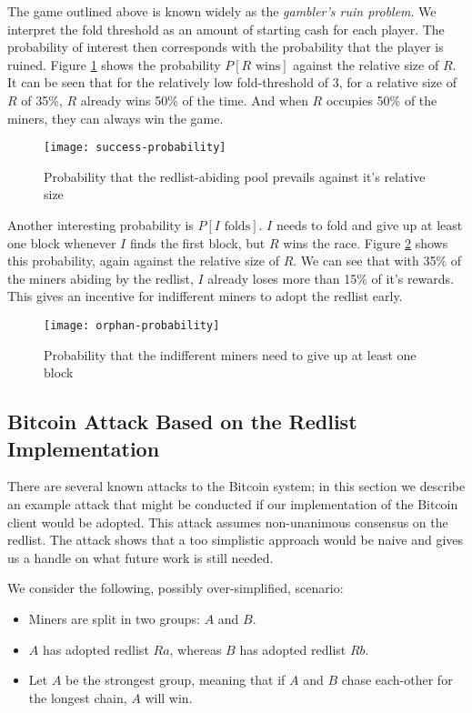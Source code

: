 \documentclass[12pt,journal,compsoc]{IEEEtran}
\begin{document}
The game outlined above is known widely as the \emph{gambler's ruin problem}\cite{feller}.
We interpret the fold threshold as an amount of starting cash for each player.
The probability of interest then corresponds with the probability that the player is ruined.
Figure \ref{fig:redlist-wins} shows the probability $P[\text{$R$ wins}]$ against the relative size
of $R$.
It can be seen that for the relatively low fold-threshold of $3$, for a relative size of $R$ of
35\%, $R$ already wins 50\% of the time.
And when $R$ occupies 50\% of the miners, they can always win the game.

\begin{figure}[h!]
\centering
\texttt{[image: success-probability]}
\caption{Probability that the redlist-abiding pool prevails against it's relative size}
\label{fig:redlist-wins}
\end{figure}

Another interesting probability is $P[\text{$I$ folds}]$.
$I$ needs to fold and give up at least one block whenever $I$ finds the first block, but $R$ wins
the race.
Figure \ref{fig:indif-folds} shows this probability, again against the relative size of $R$.
We can see that with 35\% of the miners abiding by the redlist, $I$ already loses more than 15\% of
it's rewards.
This gives an incentive for indifferent miners to adopt the redlist early.

\begin{figure}[h!]
\centering
\texttt{[image: orphan-probability]}
\caption{Probability that the indifferent miners need to give up at least one block}
\label{fig:indif-folds}
\end{figure}

\subsection{Bitcoin Attack Based on the Redlist Implementation}
There are several known attacks to the Bitcoin system\cite{barber2012bitter}; in this section we describe an example attack that might be conducted if our implementation of the Bitcoin client would be
adopted. This attack assumes non-unanimous consensus on the redlist.
The attack shows that a too simplistic approach would be naive and gives us a handle on what future work
is still needed.

We consider the following, possibly over-simplified, scenario:

\begin{itemize}
  \item Miners are split in two groups: $A$ and $B$.
  \item $A$ has adopted redlist $Ra$, whereas $B$ has adopted redlist $Rb$.
  \item Let $A$ be the strongest group, meaning that if $A$ and $B$ chase each-other for the longest
    chain, $A$ will win.
\end{itemize}
\end{document}
